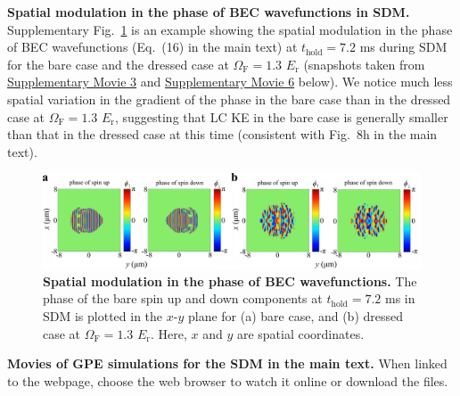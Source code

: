 \documentclass[showpacs,preprintnumbers,amsmath,amssymb, superscriptaddress, aps, reprint]{revtex4-1}
\def\E_r{E_{\text{r}}}
\def\OmegaF{\Omega_{\text{F}}}
\def\thold{t_{\text{hold}}}
\begin{document}
{{\newpage
\noindent
\textbf{Spatial modulation in the phase of BEC wavefunctions in SDM.} Supplementary Fig.~\ref{FigSI_Phase} is an example showing the spatial modulation in the phase of BEC wavefunctions ({Eq.~(16) in the main text}) at $\thold = 7.2$ ms during SDM for the bare case and the dressed case at $\OmegaF = 1.3$ $\E_r$ (snapshots taken from \hyperlink{anim3}{Supplementary Movie 3} and \hyperlink{anim6}{Supplementary Movie 6} below). We notice much less spatial variation in the gradient of the phase in the bare case than in the dressed case at $\OmegaF = 1.3$ $\E_r$, suggesting that LC KE in the bare case is generally smaller than that in the dressed case at this time (consistent with {Fig.~8h in the main text}).
\vspace{5mm}
\begin{figure}[H]
\centering
\includegraphics[width=6.8in]{SI_Fig9_Phase_Vfinal.pdf}
\caption{\textbf{Spatial modulation in the phase of BEC wavefunctions.} The phase of the bare spin up and down components at $\thold = 7.2$ ms in SDM is plotted in the {$x$-$y$} plane for (a) bare case, and (b) dressed case at $\OmegaF=1.3$ $\E_r$. Here, $x$ and $y$ are spatial coordinates.}
\label{FigSI_Phase}
\end{figure}

\vspace{5mm}
\noindent
\textbf{Movies of GPE simulations for the SDM in the main text.} When linked to the webpage, choose the web browser to watch it online or download the files.

}}
\end{document}

